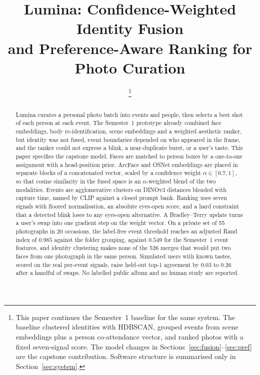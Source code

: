 \documentclass[conference]{IEEEtran}
\begin{document}
\title{Lumina: Confidence-Weighted Identity Fusion\\ and Preference-Aware Ranking for Photo Curation}

\author{
\thanks{This paper continues the Semester~1 baseline for the same system.
The baseline clustered identities with HDBSCAN, grouped events from scene
embeddings plus a person co-attendance vector, and ranked photos with a fixed
seven-signal score. The model changes in Sections~\ref{sec:fusion}--\ref{sec:pref}
are the capstone contribution. Software structure is summarised only in
Section~\ref{sec:system}.}
}

\maketitle

\begin{abstract}
Lumina curates a personal photo batch into events and people, then selects a
best shot of each person at each event. The Semester~1 prototype already
combined face embeddings, body re-identification, scene embeddings and a
weighted aesthetic ranker, but identity was not fused, event boundaries
depended on who appeared in the frame, and the ranker could not express a
blink, a near-duplicate burst, or a user's taste. This paper specifies the
capstone model. Faces are matched to person boxes by a one-to-one assignment
with a head-position prior. ArcFace and OSNet embeddings are placed in separate
blocks of a concatenated vector, scaled by a confidence weight $\alpha\in[0.7,1]$,
so that cosine similarity in the fused space is an $\alpha$-weighted blend of
the two modalities. Events are agglomerative clusters on \mbox{DINOv3} distances
blended with capture time, named by CLIP against a closed prompt bank.
Ranking uses seven signals with floored normalisation, an absolute eyes-open
score, and a hard constraint that a detected blink loses to any eyes-open
alternative. A Bradley--Terry update turns a user's swap into one gradient step
on the weight vector. On a private set of 55 photographs in 20 occasions, the
label-free event threshold reaches an adjusted Rand index of $0.985$ against
the folder grouping, against $0.549$ for the Semester~1 event features, and
identity clustering makes none of the 526 merges that would put two faces from
one photograph in the same person. Simulated users with known tastes, scored
on the real per-event signals, raise held-out top-1 agreement by $0.03$ to
$0.26$ after a handful of swaps. No labelled public album and no human study
are reported.
\end{abstract}
\end{document}
